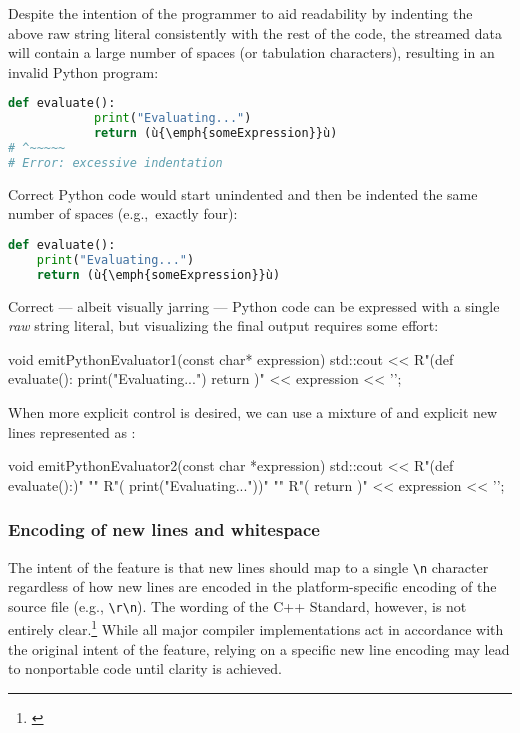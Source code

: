 \noindent Despite the intention of the programmer to aid readability by indenting
the above raw string literal consistently with the rest of the code, the
streamed data will contain a large number of spaces (or tabulation
characters), resulting in an invalid Python program:

\begin{lstlisting}[language=python]
        def evaluate():
            print("Evaluating...")
            return (ù{\emph{someExpression}}ù)
# ^~~~~~
# Error: excessive indentation
\end{lstlisting}
    
\noindent Correct Python code would start unindented and then be indented the same number
of spaces (e.g.,~exactly four):

\begin{lstlisting}[language=python]
def evaluate():
    print("Evaluating...")
    return (ù{\emph{someExpression}}ù)
\end{lstlisting}
    
\noindent Correct --- albeit visually jarring --- Python code can be expressed with a
single \emph{raw} string literal, but visualizing the final output requires some effort:

\begin{emcppslisting}[emcppsbatch=e3]
void emitPythonEvaluator1(const char* expression)
{
    std::cout << R"(def evaluate():
    print("Evaluating...")
    return )" << expression << '\n';
}
\end{emcppslisting}
    
\noindent When more explicit control is desired, we can use a mixture of
 and explicit new lines represented as
:

\begin{emcppslisting}[emcppsbatch=e4]
void emitPythonEvaluator2(const char *expression)
{
    std::cout <<
        R"(def evaluate():)"                 "\n"
        R"(    print("Evaluating..."))"      "\n"
        R"(    return )" << expression << '\n';
}
\end{emcppslisting}
    

\subsubsection[Encoding of new lines and whitespace]{Encoding of new lines and whitespace}\label{encoding-of-newlines-and-whitespace}

The intent of the feature is that new lines should map to a single
\lstinline!\n! character regardless of how new lines are encoded
in the platform-specific encoding of the source file (e.g., \lstinline!\r\n!). The wording of the C++ Standard, however, is not
entirely clear.\footnote{\cite{miller13}} While all major compiler
implementations act in accordance with the original intent of the
feature, relying on a specific new line encoding may lead to nonportable
code until clarity is achieved.


